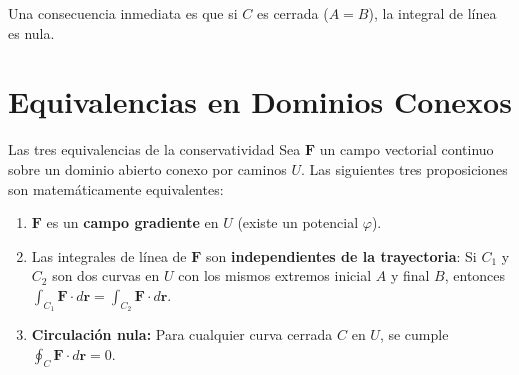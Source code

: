 \documentclass[11pt,a4paper]{article}
\begin{document}
Una consecuencia inmediata es que si $C$ es cerrada ($A=B$), la integral de línea es nula.

\section{Equivalencias en Dominios Conexos}

\begin{teoremabox}{Las tres equivalencias de la conservatividad}
Sea $\mathbf{F}$ un campo vectorial continuo sobre un dominio abierto conexo por caminos $U$. Las siguientes tres proposiciones son matemáticamente equivalentes:
\begin{enumerate}
    \item [(i)] $\mathbf{F}$ es un \textbf{campo gradiente} en $U$ (existe un potencial $\varphi$).
    \item [(ii)] Las integrales de línea de $\mathbf{F}$ son \textbf{independientes de la trayectoria}: Si $C_1$ y $C_2$ son dos curvas en $U$ con los mismos extremos inicial $A$ y final $B$, entonces $\int_{C_1} \mathbf{F} \cdot d\mathbf{r} = \int_{C_2} \mathbf{F} \cdot d\mathbf{r}$.
    \item [(iii)] \textbf{Circulación nula:} Para cualquier curva cerrada $C$ en $U$, se cumple $\oint_C \mathbf{F} \cdot d\mathbf{r} = 0$.
\end{enumerate}


\end{teoremabox}
\end{document}
